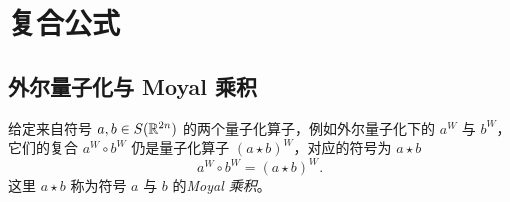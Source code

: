 
\section{复合公式}

\subsection{外尔量子化与 Moyal 乘积}

给定来自符号 \(a,b\in S(\mathbb{R}^{2n})\) 的两个量子化算子，例如外尔量子化下的 \(a^W\) 与 \(b^W\)，它们的复合 \(a^W\circ b^W\) 仍是量子化算子 \((a\star b)^W\)，对应的符号为 \(a\star b\)
\[
  a^W\circ b^W=(a\star b)^W.
\]
这里 \(a\star b\) 称为符号 \(a\) 与 \(b\) 的\emph{Moyal 乘积}。

